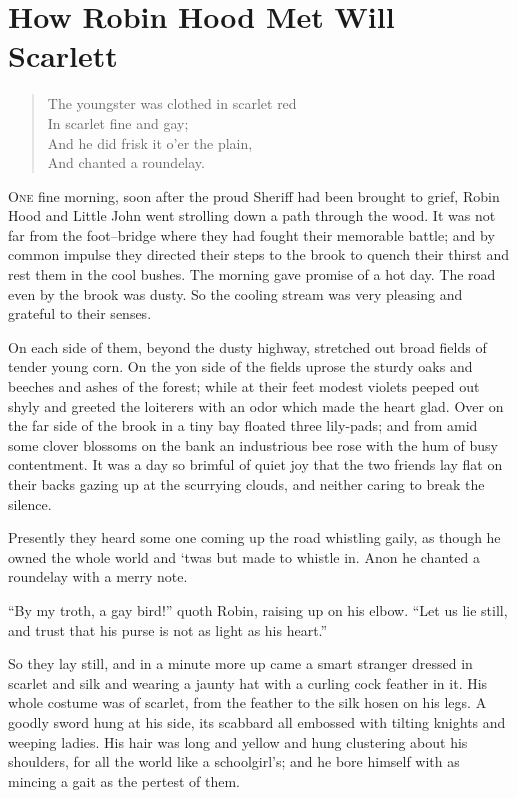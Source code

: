 \chapter{How Robin Hood Met Will Scarlett}

\begin{quote}
The youngster was clothed in scarlet red\\
In scarlet fine and gay;\\
And he did frisk it o’er the plain,\\
And chanted a roundelay.
\end{quote}

\lettrine{O}{ne} fine morning, soon after the proud Sheriff had been
brought to grief, Robin Hood and Little John went strolling down a path
through the wood. It was not far from the foot--bridge where they had
fought their memorable battle; and by common impulse they directed their
steps to the brook to quench their thirst and rest them in the cool
bushes. The morning gave promise of a hot day. The road even by the brook
was dusty. So the cooling stream was very pleasing and grateful to their
senses.

On each side of them, beyond the dusty highway, stretched out broad
fields of tender young corn. On the yon side of the fields uprose the
sturdy oaks and beeches and ashes of the forest; while at their feet
modest violets peeped out shyly and greeted the loiterers with an odor
which made the heart glad. Over on the far side of the brook in a tiny
bay floated three lily-pads; and from amid some clover blossoms on the
bank an industrious bee rose with the hum of busy contentment. It was a
day so brimful of quiet joy that the two friends lay flat on their backs
gazing up at the scurrying clouds, and neither caring to break the
silence.

Presently they heard some one coming up the road whistling gaily, as
though he owned the whole world and `twas but made to whistle in. Anon
he chanted a roundelay with a merry note.

``By my troth, a gay bird!'' quoth Robin, raising up on his elbow. ``Let
us lie still, and trust that his purse is not as light as his heart.''

So they lay still, and in a minute more up came a smart stranger dressed
in scarlet and silk and wearing a jaunty hat with a curling cock feather
in it. His whole costume was of scarlet, from the feather to the silk
hosen on his legs. A goodly sword hung at his side, its scabbard all
embossed with tilting knights and weeping ladies. His hair was long and
yellow and hung clustering about his shoulders, for all the world like a
schoolgirl's; and he bore himself with as mincing a gait as the pertest
of them.

